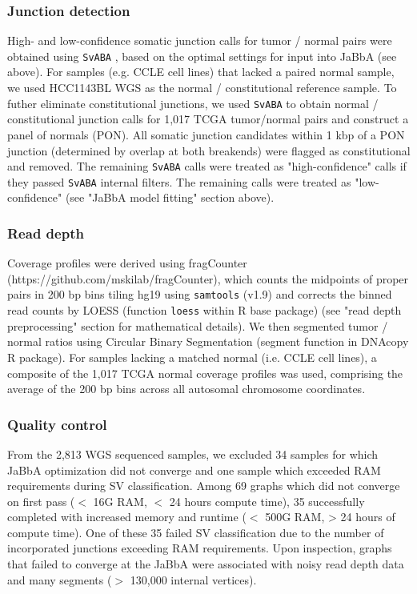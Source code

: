\documentclass[phd,tocprelim]{cornell}
\begin{document}
\subsubsection*{Junction detection}

High- and low-confidence somatic junction calls for tumor / normal pairs were obtained using \texttt{SvABA} \cite{wala2018}, based on the optimal settings for input into JaBbA (see above). For samples (e.g. CCLE cell lines) that lacked a paired normal sample, we used HCC1143BL WGS as the normal / constitutional reference sample.
To futher eliminate constitutional junctions, we used \texttt{SvABA} to obtain normal / constitutional junction calls for 1,017 TCGA tumor/normal pairs and construct a panel of normals (PON).  All somatic junction candidates within 1 kbp of a PON junction (determined by overlap at both breakends) were flagged as constitutional and removed.  The remaining \texttt{SvABA} calls were treated as "high-confidence" calls if they passed \texttt{SvABA} internal filters.  The remaining calls were treated as "low-confidence" (see "JaBbA model fitting" section above).

\subsubsection*{Read depth} \label{meth:readDepth}
Coverage profiles were derived using fragCounter (https://github.com/mskilab/fragCounter), which counts the midpoints of proper pairs in 200 bp bins tiling hg19 using \texttt{samtools} (v1.9) and corrects the binned read counts by LOESS (function \texttt{loess} within R base package) (see "read depth preprocessing" section for mathematical details). We then segmented tumor / normal ratios using Circular Binary Segmentation \cite{olshen2004} (segment function in DNAcopy R package). For samples lacking a matched normal (i.e. CCLE cell lines), a composite of the 1,017 TCGA normal coverage profiles was used, comprising the average of the 200 bp bins across all autosomal chromosome coordinates.

\subsubsection*{Quality control}
From the 2,813 WGS sequenced samples, we excluded 34 samples for which JaBbA optimization did not converge and one sample which exceeded RAM requirements during SV classification. Among 69 graphs which did not converge on first pass ($<$ 16G RAM, $<$ 24 hours compute time), 35 successfully completed with increased memory and runtime ($<$ 500G RAM, > 24 hours of compute time).  One of these 35 failed SV classification due to the number of incorporated junctions exceeding RAM requirements.  Upon inspection, graphs that failed to converge at the JaBbA were associated with noisy read depth data and many segments ($>$ 130,000 internal vertices).
\end{document}

